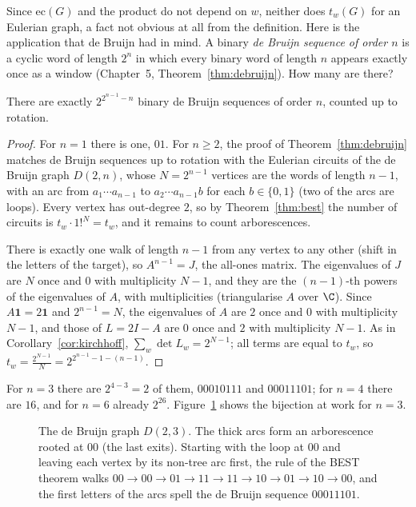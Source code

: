 Since $\mathrm{ec}(G)$ and the product do not depend on $w$, neither does $t_w(G)$ for an Eulerian graph, a fact not obvious at all from the definition. Here is the application that de Bruijn
had in mind. A binary \emph{de Bruijn sequence of order $n$} is a cyclic word of length $2^n$ in which every binary word of length $n$ appears exactly once as a window
(Chapter~5, Theorem~\ref{thm:debruijn}). How many are there?

\begin{corollary}\label{cor:debruijncount}
There are exactly $2^{2^{n-1}-n}$ binary de Bruijn sequences of order $n$, counted up to rotation.
\end{corollary}
\begin{proof}
For $n=1$ there is one, $01$. For $n\ge2$, the proof of Theorem~\ref{thm:debruijn} matches de Bruijn sequences up to rotation with the Eulerian circuits of the de Bruijn graph $D(2,n)$, whose $N=2^{n-1}$
vertices are the words of length $n-1$, with an arc from $a_1\cdots a_{n-1}$ to $a_2\cdots a_{n-1}b$ for each $b\in\{0,1\}$ (two of the arcs are loops). Every vertex has out-degree $2$, so by
Theorem~\ref{thm:best} the number of circuits is $t_w\cdot1!^N=t_w$, and it remains to count arborescences.

There is exactly one walk of length $n-1$ from any vertex to any other (shift in the letters of the target), so $A^{n-1}=J$, the all-ones matrix. The eigenvalues of $J$ are $N$ once and $0$
with multiplicity $N-1$, and they are the $(n-1)$-th powers of the eigenvalues of $A$, with multiplicities (triangularise $A$ over $\C$). Since $A\mathbf1=2\mathbf1$ and $2^{n-1}=N$, the eigenvalues
of $A$ are $2$ once and $0$ with multiplicity $N-1$, and those of $L=2I-A$ are $0$ once and $2$ with multiplicity $N-1$. As in Corollary~\ref{cor:kirchhoff}, $\sum_w\det L_w=2^{N-1}$; all terms are equal
to $t_w$, so $t_w=\frac{2^{N-1}}N=2^{2^{n-1}-1-(n-1)}$.
\end{proof}

For $n=3$ there are $2^{4-3}=2$ of them, $00010111$ and $00011101$; for $n=4$ there are $16$, and for $n=6$ already $2^{26}$. Figure~\ref{fig:best} shows the bijection at work for $n=3$.

\begin{figure}[ht]
\centering
{}
\caption{The de Bruijn graph $D(2,3)$. The thick arcs form an arborescence rooted at $00$ (the last exits). Starting with the loop at $00$ and leaving each vertex by its
non-tree arc first, the rule of the BEST theorem walks $00\to00\to01\to11\to11\to10\to01\to10\to00$, and the first letters of the arcs spell the de Bruijn sequence $00011101$.}
\label{fig:best}
\end{figure}


